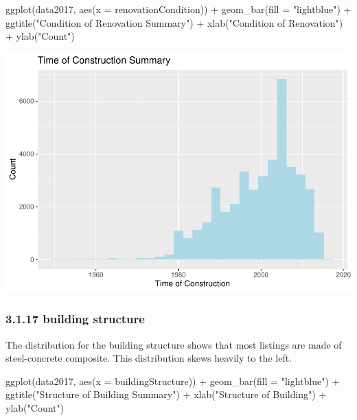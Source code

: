 \documentclass[
]{article}
\newenvironment{Shaded}{\begin{snugshade}}{\end{snugshade}}
\newcommand{\AttributeTok}[1]{\textcolor[rgb]{0.77,0.63,0.00}{#1}}
\newcommand{\FunctionTok}[1]{\textcolor[rgb]{0.00,0.00,0.00}{#1}}
\newcommand{\NormalTok}[1]{#1}
\newcommand{\SpecialCharTok}[1]{\textcolor[rgb]{0.00,0.00,0.00}{#1}}
\newcommand{\StringTok}[1]{\textcolor[rgb]{0.31,0.60,0.02}{#1}}
\begin{document}
\begin{Shaded}
\begin{Highlighting}[]
\FunctionTok{ggplot}\NormalTok{(data2017, }\FunctionTok{aes}\NormalTok{(}\AttributeTok{x =}\NormalTok{ renovationCondition)) }\SpecialCharTok{+}
  \FunctionTok{geom\_bar}\NormalTok{(}\AttributeTok{fill =} \StringTok{"lightblue"}\NormalTok{) }\SpecialCharTok{+}
  \FunctionTok{ggtitle}\NormalTok{(}\StringTok{"Condition of Renovation Summary"}\NormalTok{) }\SpecialCharTok{+}
  \FunctionTok{xlab}\NormalTok{(}\StringTok{"Condition of Renovation"}\NormalTok{) }\SpecialCharTok{+}
  \FunctionTok{ylab}\NormalTok{(}\StringTok{"Count"}\NormalTok{)}
\end{Highlighting}
\end{Shaded}

\includegraphics{Project_files/figure-latex/unnamed-chunk-30-1.pdf}

\hypertarget{building-structure}{%
\subsubsection{3.1.17 building structure}\label{building-structure}}

The distribution for the building structure shows that most listings are
made of steel-concrete composite. This distribution skews heavily to the
left.

\begin{Shaded}
\begin{Highlighting}[]
\FunctionTok{ggplot}\NormalTok{(data2017, }\FunctionTok{aes}\NormalTok{(}\AttributeTok{x =}\NormalTok{ buildingStructure)) }\SpecialCharTok{+}
  \FunctionTok{geom\_bar}\NormalTok{(}\AttributeTok{fill =} \StringTok{"lightblue"}\NormalTok{) }\SpecialCharTok{+}
  \FunctionTok{ggtitle}\NormalTok{(}\StringTok{"Structure of Building Summary"}\NormalTok{) }\SpecialCharTok{+}
  \FunctionTok{xlab}\NormalTok{(}\StringTok{"Structure of Building"}\NormalTok{) }\SpecialCharTok{+}
  \FunctionTok{ylab}\NormalTok{(}\StringTok{"Count"}\NormalTok{)}
\end{Highlighting}
\end{Shaded}
\end{document}
